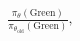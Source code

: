 \documentclass[preview]{standalone}
\begin{document}
\begin{align*}
\frac{\pi_\theta(\text{Green})}{\pi_{\theta_{\text{old}}}(\text{Green})},
\end{align*}
\end{document}
